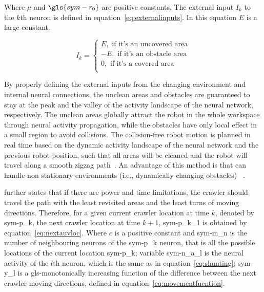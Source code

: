 \noindent Where $ \mu $ and $ \gls{sym-r_0} $ are positive constants, The external input $ I_k $ to the $ k $th neuron
is defined in equation~\ref{eq:externalinputs}. In this equation $ E $ is a large constant.

\begin{equation}\label{eq:externalinputs}
	I_k = \left\{
	\begin{array}{ll}
		E, \text{ if it's an uncovered area} \\
		-E, \text{ if it's an obstacle area} \\
		0, \text{ if it's a covered area}\\
	\end{array}
	\right.
\end{equation}

By properly defining the external inputs from the changing environment and internal neural connections, the unclean
areas and obstacles are guaranteed to stay at the peak and the valley of the activity landscape of the neural network,
respectively. The unclean areas globally attract the robot in the whole workspace through neural activity propagation,
while the obstacles have only local effect in a small region to avoid collisions. The collision-free robot motion is
planned in real time based on the dynamic activity landscape of the neural network and the previous robot position, such
that all areas will be cleaned and the robot will travel along a smooth zigzag path~\cite{luo_bioinspired_2008}. An
advantage of this method is that can handle non stationary environments (i.e., dynamically changing obstacles)~
\cite{galceran_survey_2013}.

\citeauthor{yan_complete_2012} further states that if there are power and time limitations, the crawler should
travel the path with the least revisited areas and the least turns of moving directions. Therefore, for a given current
crawler location at time \( k \), denoted by \gls{sym-p_k}, the next crawler location at time \(k + 1\),
\gls{sym-p_k_1} is obtained by equation~\ref{eq:nextauvloc}. Where \( c \) is a positive constant and \gls{sym-m_n} is
the number of neighbouring neurons of the \gls{sym-p_k} neuron, that is all the possible locations of the current
location \gls{sym-p_k}; variable \gls{sym-n_a_l} is the neural activity of the \( l \)th neuron, which is the same as in
equation~\ref{eq:shunting}; \gls{sym-y_l} is a \gls{gls-monotonically} increasing function of the difference  between
the next crawler moving directions, defined in equation~\ref{eq:movementfucntion}.

